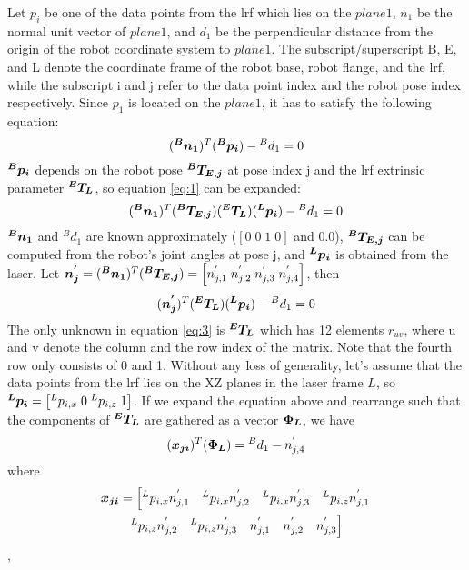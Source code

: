 Let $p_i$ be one of the data points from the \ac{lrf} which lies on the $plane 1$, $n_1$ be the normal unit vector of $plane 1$, and $d_1$ be the perpendicular distance from the origin of the robot coordinate system to $plane 1$. The subscript/superscript B, E, and L denote the coordinate frame of the robot base, robot flange, and the \ac{lrf}, while the subscript i and j refer to the data point index and the robot pose index respectively. Since $p_1$ is located on the $plane 1$, it has to satisfy the following equation:
  \begin{equation}
  \label{eq:1}
  (\vb*{{^B}n_1}) ^T (\vb*{{^B}p_i}) - {^B}d_1 = 0
   \end{equation}
$\vb*{{^B}p_i}$ depends on the robot pose $\vb*{{^B}T_{E,j}}$ at pose index j and the \ac{lrf} extrinsic parameter $\vb*{{^E}T_L}$, so equation \ref{eq:1} can be expanded:
  \begin{equation}
  (\vb*{{^B}n_1}) ^T (\vb*{{^B}T_{E,j}}) (\vb*{{^E}T_L}) (\vb*{{^L}p_i}) - {^B}d_1 = 0
  \end{equation}
$\vb*{{^B}n_1}$ and $^{B}d_1$ are known approximately ($[0 \; 0\; 1\;0]$ and $0.0$), $\vb*{{^B}T_{E,j}}$ can be computed from the robot's joint angles at pose j, and $\vb*{{^L}p_i}$ is obtained from the laser. Let $\vb*{n^{'}_j} = (\vb*{{^B}n_1}) ^T (\vb*{{^B}T_{E,j}}) = 
\left[n^{'}_{j,1} \; n^{'}_{j,2} \; n^{'}_{j,3}  \; n^{'}_{j,4} \right]$, then  
  \begin{equation}
  \label{eq:3}
  (\vb*{n^{'}_j}) ^T (\vb*{{^E}T_L}) (\vb*{{^L}p_i}) - {^B}d_1 = 0
  \end{equation}
The only unknown in equation \ref{eq:3} is $\vb*{{^E}T_L}$ which has 12 elements $r_{uv}$, where u and v denote the column and the row index of the matrix. Note that the fourth row only consists of 0 and 1. 
Without any loss of generality, let's assume that the data points from the \ac{lrf} lies on the XZ planes in the laser frame $L$, so $\vb*{{^L}p_i} = \left[{^L}p_{i,x} \; 0 \; {^L}p_{i,z}\; 1\right]$. If we expand the equation above and rearrange such that the components of $\vb*{{^E}T_L}$ are gathered as a vector $\vb*{\Phi_L}$, we have
\begin{equation}
\label{eq:4}
  (\vb*{x_{ji}})  ^T (\vb*{\Phi_L}) = {^B}d_1 -  n^{'}_{j,4}
\end{equation}
where 
\begin{multline}
  \vb*{x_{ji}} = \left[{^L}p_{i,x}n^{'}_{j,1} \quad {^L}p_{i,x}n^{'}_{j,2}\quad {^L}p_{i,x}n^{'}_{j,3}\quad  {^L}p_{i,z}n^{'}_{j,1}\right. \\ 
\left. {^L}p_{i,z}n^{'}_{j,2}\quad {^L}p_{i,z}n^{'}_{j,3} \quad n^{'}_{j,1} \quad n^{'}_{j,2} \quad n^{'}_{j,3} \right]
\end{multline}, 
